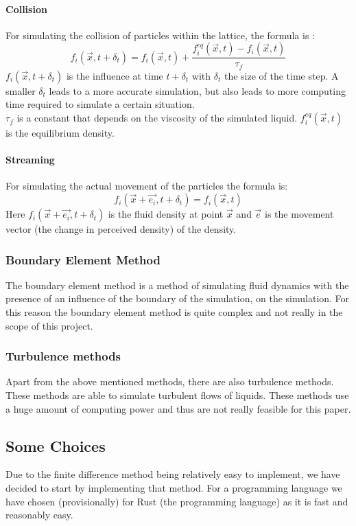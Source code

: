 \documentclass{article}
\begin{document}
\paragraph{Collision} %
For simulating the collision of particles within the lattice, the formula is \cite{Lattice Boltzmann implementation}:
\[f_{i}(\vec{x}, t + \delta_t) = f_{i}(\vec{x}, t) + \frac{f_{i}^{eq}(\vec{x},t) - f_{i}(\vec{x},t)}{\tau_{f}}\]
$f_{i}(\vec{x}, t + \delta_t)$ is the influence at time $t + \delta_t$ with $\delta_t$ the size of the time step. A smaller $\delta_t$ leads to a more accurate simulation, but also leads to more computing time required to simulate a certain situation. \\
$\tau_{f}$ is a constant that depends on the viscosity of the simulated liquid. $f_{i}^{eq}(\vec{x},t)$ is the equilibrium density.
\paragraph{Streaming}
For simulating the actual movement of the particles the formula is: 
\[f_{i}(\vec{x}+\vec{e_i},t + \delta_t) = f_{i}(\vec{x},t)\]
Here $f_{i}(\vec{x}+\vec{e_i},t + \delta_t)$ is the fluid density at point $\vec{x}$ and $\vec{e}$ is the movement vector (the change in perceived density) of the density.
\subsubsection{Boundary Element Method}
The boundary element method is a method of simulating fluid dynamics with the presence of an influence of the boundary of the simulation, on the simulation. For this reason the boundary element method is quite complex and not really in the scope of this project. \cite{Boundary Element Method}
\subsubsection{Turbulence methods}
Apart from the above mentioned methods, there are also turbulence methods. These methods are able to simulate turbulent flows of liquids. These methods use a huge amount of computing power and thus are not really feasible for this paper.
\subsection{Some Choices}
Due to the finite difference method being relatively easy to implement, we have decided to start by implementing that method. For a programming language we have chosen (provisionally) for Rust \cite{Rust} (the programming language) as it is fast and reasonably easy.
\end{document}
